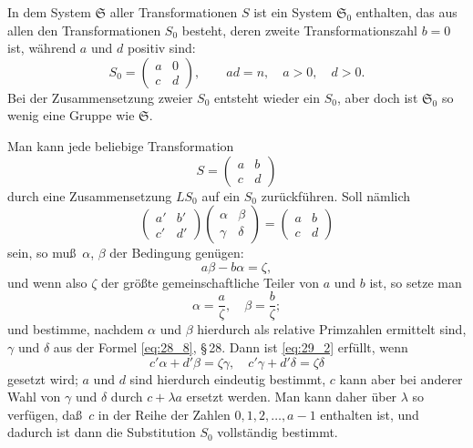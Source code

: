 \documentclass[12pt,a4paper]{article}
\begin{document}
\bigskip
In dem System $\mathfrak{S}$ aller Transformationen $S$ ist ein System $\mathfrak{S}_0$ enthalten, das aus allen den Transformationen $S_0$ besteht, deren zweite Transformationszahl $b=0$ ist, w\"ahrend $a$ und $d$ positiv sind:
\begin{equation}\label{eq:29_1}
S_0 = \begin{pmatrix} a & 0 \\ c & d \end{pmatrix},\qquad ad=n,\quad a>0,\quad d>0.
\end{equation}
Bei der Zusammensetzung zweier $S_0$ entsteht wieder ein $S_0$, aber doch ist $\mathfrak{S}_0$ so wenig eine Gruppe wie $\mathfrak{S}$.

Man kann jede beliebige Transformation
\begin{equation}\label{eq:29_S}
S = \begin{pmatrix} a & b \\ c & d \end{pmatrix}
\end{equation}
durch eine Zusammensetzung $LS_0$ auf ein $S_0$ zur\"uckf\"uhren. Soll n\"amlich
\begin{equation}\label{eq:29_2}
\begin{pmatrix} a' & b' \\ c' & d' \end{pmatrix}\begin{pmatrix} \alpha & \beta \\ \gamma & \delta \end{pmatrix} = \begin{pmatrix} a & b \\ c & d \end{pmatrix}
\end{equation}
sein, so mu\ss\ $\alpha$, $\beta$ der Bedingung gen\"ugen:
\[
a\beta-b\alpha=\zeta,
\]
und wenn also $\zeta$ der gr\"o\ss te gemeinschaftliche Teiler von $a$ und $b$ ist, so setze man
\[
\alpha=\frac{a}{\zeta},\quad \beta=\frac{b}{\zeta};
\]
und bestimme, nachdem $\alpha$ und $\beta$ hierdurch als relative Primzahlen ermittelt sind, $\gamma$ und $\delta$ aus der Formel \eqref{eq:28_8}, \S\,28. Dann ist \eqref{eq:29_2} erf\"ullt, wenn
\[
c'\alpha+d'\beta=\zeta\gamma,\quad c'\gamma+d'\delta=\zeta\delta
\]
gesetzt wird; $a$ und $d$ sind hierdurch eindeutig bestimmt, $c$ kann aber bei anderer Wahl von $\gamma$ und $\delta$ durch $c+\lambda a$ ersetzt werden. Man kann daher \"uber $\lambda$ so verf\"ugen, da\ss\ $c$ in der Reihe der Zahlen $0,1,2,\ldots,a-1$ enthalten ist, und dadurch ist dann die Substitution $S_0$ vollst\"andig bestimmt.
\end{document}
